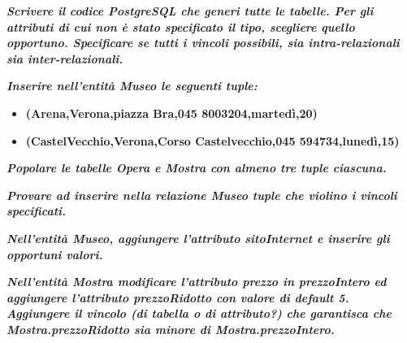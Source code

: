\documentclass[a4paper]{article}
\begin{document}
	\noindent
	\textcolor{Green4}{\textbf{\emph{Scrivere il codice PostgreSQL che generi tutte le tabelle. Per gli attributi di cui non è stato specificato il tipo, scegliere quello opportuno. Specificare se tutti i vincoli possibili, sia intra-relazionali sia inter-relazionali.}}}\newline

	\noindent
	\newpage

	\noindent
	\textcolor{Green4}{\textbf{\emph{Inserire nell'entità Museo le seguenti tuple:}}}
	\begin{itemize}
		\item \textcolor{Green4}{\textsf{\textbf{(Arena,Verona,piazza Bra,045 8003204,martedì,20)}}}
		\item \textcolor{Green4}{\textsf{\textbf{(CastelVecchio,Verona,Corso Castelvecchio,045 594734,lunedì,15)}}}
	\end{itemize}

	\noindent
	\:\newline

	\noindent
	\textcolor{Green4}{\textbf{\emph{Popolare le tabelle Opera e Mostra con almeno tre tuple ciascuna.}}}\newline

	\noindent
	\:\newline

	\noindent
	\textcolor{Green4}{\textbf{\emph{Provare ad inserire nella relazione Museo tuple che violino i vincoli specificati.}}}\newline

	\noindent
	\:\newline

	\noindent
	\textcolor{Green4}{\textbf{\emph{Nell'entità Museo, aggiungere l'attributo sitoInternet e inserire gli opportuni valori.}}}\newline

	\noindent
	\newpage

	\noindent
	\textcolor{Green4}{\textbf{\emph{Nell'entità Mostra modificare l'attributo prezzo in prezzoIntero ed aggiungere l'attributo prezzoRidotto con valore di default 5. Aggiungere il vincolo (di tabella o di attributo?) che garantisca che Mostra.prezzoRidotto sia minore di Mostra.prezzoIntero.}}}\newline
\end{document}
